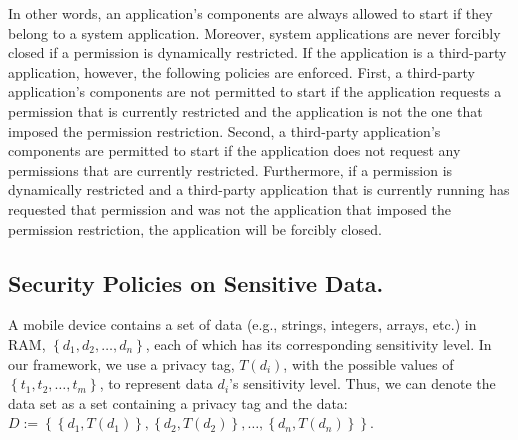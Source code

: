 



In other words, an application's components are always allowed to
start if they belong to a system application.  Moreover, system
applications are never forcibly closed if a permission is dynamically
restricted.  If the application is a third-party application, however,
the following policies are enforced. First, a third-party
application's components are not permitted to start if the application
requests a permission that is currently restricted and the application
is not the one that imposed the permission restriction.  Second, a
third-party application's components are permitted to start if the
application does not request any permissions that are currently
restricted. Furthermore, if a permission is dynamically restricted and
a third-party application that is currently running has requested that 
permission and was not the application that imposed the permission
restriction, the application will be forcibly closed.


\subsection{Security Policies on Sensitive Data.}
A mobile device contains a set of data (e.g., strings, integers, arrays,
etc.) in RAM, $\left\{d_{1},d_{2},\ldots,d_{n}\right\}$,
each of which has its corresponding sensitivity level. In our
framework, we use a privacy tag, $T(d_i)$, with the possible values of
$\left\{t_{1},t_{2},\ldots,t_{m}\right\}$, to represent data $d_i$'s
sensitivity level.
%
Thus, we can denote the data set as a set containing a privacy tag and
the data:
$D := \left\{\left\{d_{1}, T\left(d_{1}\right)\right\},\left\{d_{2},T\left(d_{2}\right)\right\},\ldots,\left\{d_{n},T\left(d_{n}\right)\right\}\right\}$.

